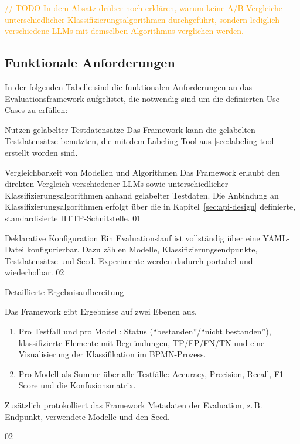 \textcolor{orange}{// TODO In dem Absatz drüber noch erklären, warum keine A/B-Vergleiche unterschiedlicher Klassifizierungsalgorithmen durchgeführt, sondern lediglich verschiedene \acp{LLM} mit demselben Algorithmus verglichen werden.}

\subsection*{Funktionale Anforderungen}

In der folgenden Tabelle sind die funktionalen Anforderungen an das Evaluationsframework aufgelistet, die notwendig sind um die definierten Use-Cases zu erfüllen:

\begin{center}
    {Nutzen gelabelter Testdatensätze}
    {Das Framework kann die gelabelten Testdatensätze benutzten, die mit dem Labeling-Tool aus \ref{sec:labeling-tool} erstellt worden sind.}
    {}
\end{center}

\begin{center}
    {Vergleichbarkeit von Modellen und Algorithmen}
    {Das Framework erlaubt den direkten Vergleich verschiedener \acp{LLM} sowie unterschiedlicher Klassifizierungsalgorithmen anhand gelabelter Testdaten. Die Anbindung an Klassifizierungsalgorithmen erfolgt über die in Kapitel~\ref{sec:api-design} definierte, standardisierte HTTP-Schnitstelle.}
    {01}
\end{center}

\begin{center}
    {Deklarative Konfiguration}
    {Ein Evaluationslauf ist vollständig über eine YAML-Datei konfigurierbar. Dazu zählen Modelle, Klassifizierungsendpunkte, Testdatensätze und Seed. Experimente werden dadurch portabel und wiederholbar.}
    {02}
\end{center}

\begin{center}
    {Detaillierte Ergebnisaufbereitung}
    {
    Das Framework gibt Ergebnisse auf zwei Ebenen aus.
    \begin{enumerate}
        \item Pro Testfall und pro Modell: Status (\enquote{bestanden}/\enquote{nicht bestanden}), klassifizierte Elemente mit Begründungen, \ac{TP}/\ac{FP}/\ac{FN}/\ac{TN} und eine Visualisierung der Klassifikation im \ac{BPMN}-Prozess.
        \item Pro Modell als Summe über alle Testfälle: Accuracy, Precision, Recall, F1-Score und die Konfusionsmatrix.
    \end{enumerate}
    Zusätzlich protokolliert das Framework Metadaten der Evaluation, z.\,B. Endpunkt, verwendete Modelle und den Seed.
    }
    {02}
\end{center}

